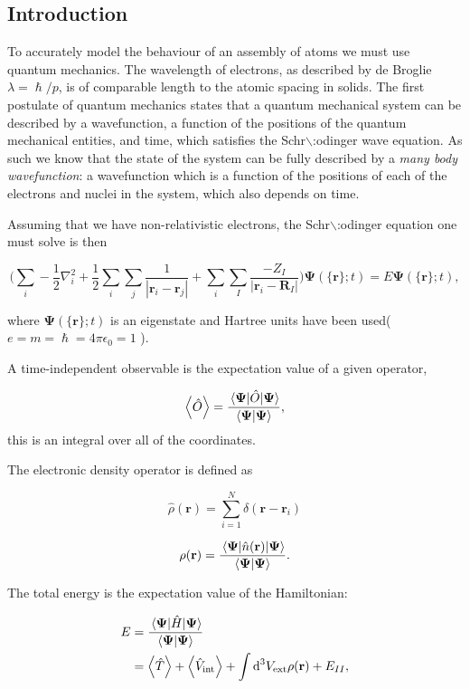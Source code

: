 \documentclass[a4paper,11pt]{article}
\numberwithin{equation}{chapter}
\numberwithin{listing}{chapter}
\begin{document}
\subsection{Introduction}
\label{sec:org42eb62d}

To accurately model the behaviour of an assembly of atoms we must use quantum mechanics. The
wavelength of electrons, as described by de Broglie \(\lambda = \hslash/p\), is of comparable length
to the atomic spacing in solids. The first postulate of quantum mechanics states that a quantum
mechanical system can be described by a wavefunction, a function of the positions of the quantum
mechanical entities, and time, which satisfies the Schr$\backslash$:odinger wave equation. As such we know that
the state of the system can be fully described by a \emph{many body wavefunction}: a wavefunction which
is a function of the positions of each of the electrons and nuclei in the system, which also depends
on time.

Assuming that we have non-relativistic electrons, the Schr$\backslash$:odinger equation one must solve is then 


\[\Big( \sum_{i} - \frac{1}{2} \nabla_{i}^{2} + \frac{1}{2} \sum_i \sum_j    \frac{1}{|
\mathbf{r}_i - \mathbf{r}_j |}+ \sum_i \sum_I \frac{-Z_I}{| \mathbf{r}_i - \mathbf{R}_I |} \Big)
\mathbf{ \Psi }(\{\mathbf{r}\}; t) = E \mathbf{ \Psi }(\{\mathbf{r}\}; t),\]


where \(\mathbf{ \Psi }(\{\mathbf{r}\}; t)\) is an eigenstate and Hartree units have been used( \(e = m = \hslash = 4\pi\epsilon_0 = 1\) ).

A time-independent observable is the expectation value of a given operator, 

\[ \expval{\hat{O}} = \frac{\expval{\hat{O}}{\mathbf{ \Psi }} }{ \bra{\mathbf{ \Psi}}\ket{\mathbf{ \Psi }} }, \]
this is an integral over all of the coordinates. 

The electronic density operator is defined as 

\[ \hat{\rho}(\mathbf{r}) = \sum_{i=1}^{N} \delta ( \mathbf{r} - \mathbf{r}_{i} ) \]

\[ \rho(\mathbf{r}) = \frac{\expval{\hat{n}(\mathbf{r})}{\mathbf{ \Psi }} }{ \bra{\mathbf{\Psi}}\ket{\mathbf{ \Psi }} }. \]

The total energy is the expectation value of the Hamiltonian:

\begin{align}
 E &= \frac{\expval{\hat{H}}{\mathbf{ \Psi }} }{ \bra{\mathbf{\Psi}}\ket{\mathbf{ \Psi }}}\\
   &= \expval{\hat{T}} + \expval{\hat{V}_{\text{int}}} + \int \text{d}^3 V_{\text{ext}} \rho(\mathbf{r}) + E_{II}, 
\label{eq:totalenergy}
\end{align}
\end{document}
